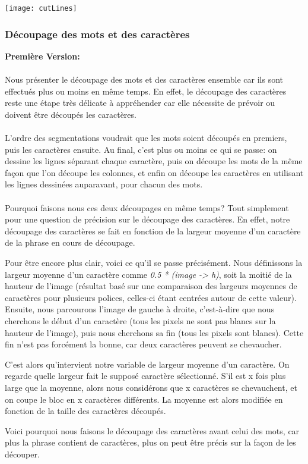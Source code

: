 \documentclass{article}
\begin{document}
	\begin{center}
		\texttt{[image: cutLines]}
	\end{center}
	
    \subsubsection{Découpage des mots et des caractères}
    \textbf{Première Version:} \\
	\paragraph{}
	Nous présenter le découpage des mots et des caractères ensemble car ils sont effectués plus ou moins en même temps. En effet, le découpage des caractères reste une étape très délicate à appréhender car elle nécessite de prévoir ou doivent être découpés les caractères.
	
	\paragraph{}
	L'ordre des segmentations voudrait que les mots soient découpés en premiers, puis les caractères ensuite. Au final, c'est plus ou moins ce qui se passe: on dessine les lignes séparant chaque caractère, puis on découpe les mots de la même façon que l'on découpe les colonnes, et enfin on découpe les caractères en utilisant les lignes dessinées auparavant, pour chacun des mots.
	
	\paragraph{}
	Pourquoi faisons nous ces deux découpages en même temps? Tout simplement pour une question de précision sur le découpage des caractères. En effet, notre découpage des caractères se fait en fonction de la largeur moyenne d'un caractère de la phrase en cours de découpage.
	\par Pour être encore plus clair, voici ce qu'il se passe précisément. Nous définissons la largeur moyenne d'un caractère comme \textit{0.5 * (image -> h)}, soit la moitié de la hauteur de l'image (résultat basé sur une comparaison des largeurs moyennes de caractères pour plusieurs polices, celles-ci étant centrées autour de cette valeur). Ensuite, nous parcourons l'image de gauche à droite, c'est-à-dire que nous cherchons le début d'un caractère (tous les pixels ne sont pas blancs sur la hauteur de l'image), puis nous cherchons sa fin (tous les pixels sont blancs). Cette fin n'est pas forcément la bonne, car deux caractères peuvent se chevaucher.
	\par C'est alors qu'intervient notre variable de largeur moyenne d'un caractère. On regarde quelle largeur fait le supposé caractère sélectionné. S'il est x fois plus large que la moyenne, alors nous considérons que x caractères se chevauchent, et on coupe le bloc en x caractères différents. La moyenne est alors modifiée en fonction de la taille des caractères découpés.
	\par Voici pourquoi nous faisons le découpage des caractères avant celui des mots, car plus la phrase contient de caractères, plus on peut être précis sur la façon de les découper.
	
\end{document}
